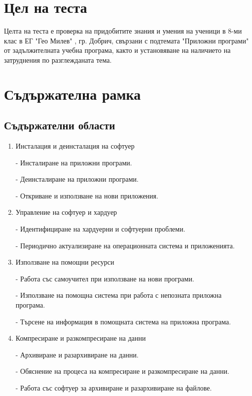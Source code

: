 \section{Цел на теста}

Целта на теста е проверка на придобитите знания и умения на ученици в 8-ми клас в ЕГ "Гео Милев" \-, гр. Добрич, свързани с подтемата "Приложни програми" от задължителната учебна програма, както и установяване на наличието на затруднения по разглежданата тема.

\section{Съдържателна рамка}

\subsection{Съдържателни области}

\begin{enumerate}
    \item Инсталация и деинсталация на софтуер
        
    - Инсталиране на приложни програми.
    
    - Деинсталиране на приложни програми.
    
    - Откриване и използване на нови приложения.
    
    \item Управление на софтуер и хардуер
    
    - Идентифициране на хардуерни и софтуерни проблеми.
    
    - Периодично актуализиране на операционната система и приложенията.
    
    \item Използване на помощни ресурси
    
    - Работа със самоучител при използване на нови програми.
    
    - Използване на помощна система при работа с непозната приложна програма.
    
    - Търсене на информация в помощната система на приложна програма.
    
    \item Компресиране и разкомпресиране на данни
    
    - Архивиране и разархивиране на данни.
    
    - Обяснение на процеса на компресиране и разкомпресиране на данни.
    
    - Работа със софтуер за архивиране и разархивиране на файлове.

\end{enumerate}

